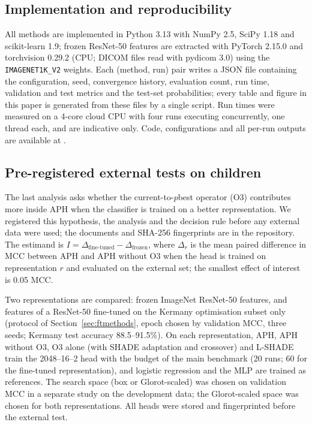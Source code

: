 \documentclass[10pt,letterpaper]{article}
\begin{document}
\subsection{Implementation and reproducibility}
All methods are implemented in Python 3.13 with NumPy 2.5, SciPy 1.18 and scikit-learn 1.9; frozen ResNet-50 features are extracted with PyTorch 2.15.0 and torchvision 0.29.2 (CPU; DICOM files read with pydicom 3.0) using the \texttt{IMAGENET1K\_V2} weights. Each (method, run) pair writes a JSON file containing the configuration, seed, convergence history, evaluation count, run time, validation and test metrics and the test-set probabilities; every table and figure in this paper is generated from these files by a single script. Run times were measured on a 4-core cloud CPU with four runs executing concurrently, one thread each, and are indicative only. Code, configurations and all per-run outputs are available at \citet{alsbakhi2026code}.

\subsection{Pre-registered external tests on children}\label{sec:extmethods}
The last analysis asks whether the current-to-$p$best operator (O3) contributes more inside APH when the classifier is trained on a better representation. We registered this hypothesis, the analysis and the decision rule before any external data were used; the documents and SHA-256 fingerprints are in the repository. The estimand is $I=\Delta_{\mathrm{fine\text{-}tuned}}-\Delta_{\mathrm{frozen}}$, where $\Delta_r$ is the mean paired difference in MCC between APH and APH without O3 when the head is trained on representation $r$ and evaluated on the external set; the smallest effect of interest is 0.05 MCC.

Two representations are compared: frozen ImageNet ResNet-50 features, and features of a ResNet-50 fine-tuned on the Kermany optimisation subset only (protocol of Section~\ref{sec:ftmethods}, epoch chosen by validation MCC, three seeds; Kermany test accuracy 88.5--91.5\%). On each representation, APH, APH without O3, O3 alone (with SHADE adaptation and crossover) and L-SHADE train the 2048--16--2 head with the budget of the main benchmark (20 runs; 60 for the fine-tuned representation), and logistic regression and the MLP are trained as references. The search space (box or Glorot-scaled) was chosen on validation MCC in a separate study on the development data; the Glorot-scaled space was chosen for both representations. All heads were stored and fingerprinted before the external test.
\end{document}
